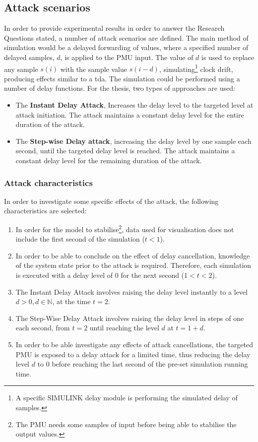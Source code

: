 \subsection{Attack scenarios}
In order to provide experimental results in order to answer the Research Questions stated, a number of attack scenarios are defined.
The main method of simulation would be a delayed forwarding of values, where a specified number of delayed samples, $d$, is applied to the PMU input. The value of $d$ is used to replace any sample $s(i)$ with the sample value $s(i-d)$, simulating\footnote{A specific SIMULINK delay module is performing the simulated delay of samples.} clock drift, producing effects similar to a \acrlong{tda}.
The simulation could be performed using a number of delay functions. For the thesis, two types of approaches are used:
\begin{itemize}
    \item The \textbf{Instant Delay Attack}, Increases the delay level to the targeted level at attack initiation. The attack maintains a constant delay level for the entire duration of the attack. 
    \item The \textbf{Step-wise Delay attack}, increasing the delay level by one sample each second, until the targeted delay level is reached. The attack maintains a constant delay level for the remaining duration of the attack.
\end{itemize}

\subsubsection{Attack characteristics}
In order to investigate some specific effects of the attack, the following characteristics are selected:
\begin{enumerate}
\item In order for the model to stabilise\footnote{The PMU needs some samples of input before being able to stabilise the output values.}, data used for visualisation does not include the first second of the simulation ($t < 1$).
\item In order to be able to conclude on the effect of delay cancellation, knowledge of the system state prior to the attack is required. Therefore, each simulation is executed  with a delay level of 0 for the next second ($1 < t < 2$). 
\item  The Instant Delay Attack involves raising the delay level instantly to a level $d > 0,  d \in \mathbb{N}$, at the time $t = 2$.
\item  The Step-Wise Delay Attack involves raising the delay level in steps of one each second, from $t = 2$ until reaching the level $d$ at $t = 1+d$.  
\item  In order to be able investigate any effects of attack cancellations, the targeted PMU is exposed to a delay attack for a limited time, thus reducing the delay level $d$ to $0$ before reaching the last second of the pre-set simulation running time.   
\end{enumerate}
    
